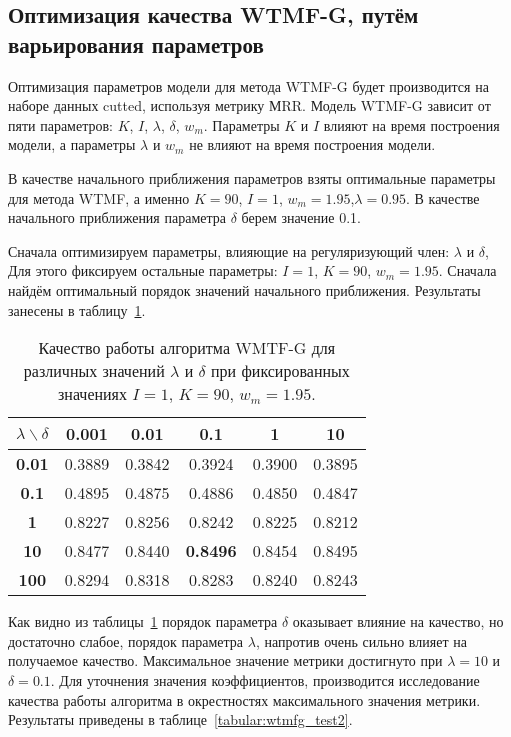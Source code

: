 \subsection{Оптимизация качества WTMF-G, путём варьирования параметров}
    Оптимизация параметров модели для метода WTMF-G будет производится на наборе данных cutted, используя метрику МRR.
    Модель WTMF-G зависит от пяти параметров: $K$, $I$, $\lambda$, $\delta$, $w_m$.
    Параметры $K$ и $I$ влияют на время построения модели, а параметры $\lambda$ и $w_m$ не влияют на время построения модели.

    В качестве начального приближения параметров взяты оптимальные параметры для метода WTMF, а именно $K=90$, $I=1$, $w_m=1.95$,$\lambda=0.95$. В качестве начального приближения параметра $\delta$ берем значение 0.1.

    Сначала оптимизируем параметры, влияющие на регуляризующий член: $\lambda$ и $\delta$,
    Для этого фиксируем остальные параметры: $I=1$, $K=90$, $w_m=1.95$.
    Сначала найдём оптимальный порядок значений начального приближения. Результаты занесены в таблицу~\ref{tabular:wtmfg_test1}.

    \begin{table}[ht!]
        \caption{Качество работы алгоритма WMTF-G для различных значений $\lambda$ и $\delta$ при фиксированных значениях $I=1$, $K=90$, $w_m=1.95$. \bigskip}
        \centering

        \label{tabular:wtmfg_test1}
        \begin{tabular}{|c|c|c|c|c|c|} \hline
            $\lambda \backslash \delta$ & \bf{0.001} & \bf{0.01} & \bf{0.1} & \bf{1} & \bf{10}  \\ \hline
            \bf{0.01} & 0.3889 & 0.3842 & 0.3924 & 0.3900 & 0.3895 \\ \hline
            \bf{0.1}  & 0.4895 & 0.4875 & 0.4886 & 0.4850 & 0.4847  \\ \hline
            \bf{1}    & 0.8227 & 0.8256 & 0.8242 & 0.8225 & 0.8212 \\ \hline
            \bf{10}   & 0.8477 & 0.8440 & \bf{0.8496} & 0.8454 & 0.8495 \\ \hline
            \bf{100}  & 0.8294 & 0.8318 & 0.8283 & 0.8240  & 0.8243 \\ \hline
        \end{tabular}
    \end{table}

    Как видно из таблицы~\ref{tabular:wtmfg_test1} порядок параметра $\delta$ оказывает влияние на качество, но достаточно слабое, порядок параметра $\lambda$, напротив очень сильно влияет на получаемое качество.
    Максимальное значение метрики достигнуто при $\lambda=10$ и $\delta=0.1$.
    Для уточнения значения коэффициентов, производится исследование качества работы алгоритма в окрестностях максимального значения метрики.
    Результаты приведены в таблице~\ref{tabular:wtmfg_test2}.

